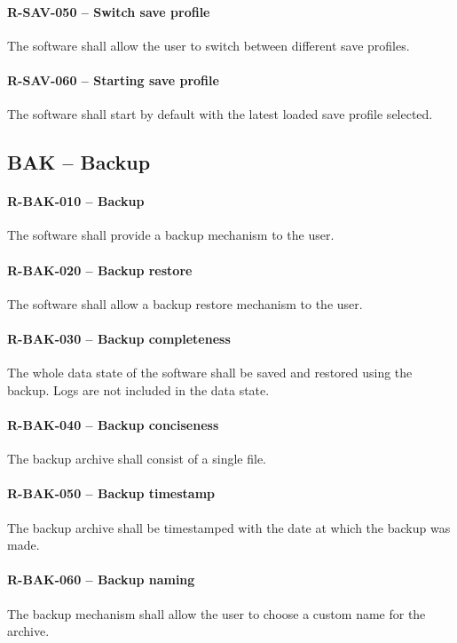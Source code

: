 \paragraph{R-SAV-050 -- Switch save profile}
The software shall allow the user to switch between different save profiles.

\paragraph{R-SAV-060 -- Starting save profile}
The software shall start by default with the latest loaded save profile
selected.

\subsection{BAK -- Backup}
\paragraph{R-BAK-010 -- Backup}
The software shall provide a backup mechanism to the user.

\paragraph{R-BAK-020 -- Backup restore}
The software shall allow a backup restore mechanism to the user.

\paragraph{R-BAK-030 -- Backup completeness}
The whole data state of the software shall be saved and restored using the
backup. Logs are not included in the data state.

\paragraph{R-BAK-040 -- Backup conciseness}
The backup archive shall consist of a single file.

\paragraph{R-BAK-050 -- Backup timestamp}
The backup archive shall be timestamped with the date at which the backup was
made.

\paragraph{R-BAK-060 -- Backup naming}
The backup mechanism shall allow the user to choose a custom name for the
archive.

